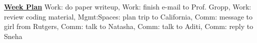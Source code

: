 {\underline{\bf Week Plan} Work: do paper writeup, Work: finish e-mail to Prof. Gropp, Work: review coding material, Mgmt:Spaces: plan trip to California, Comm: message to girl from Rutgers, Comm: talk to Natasha, Comm: talk to Aditi, Comm: reply to Sneha}\\ 


